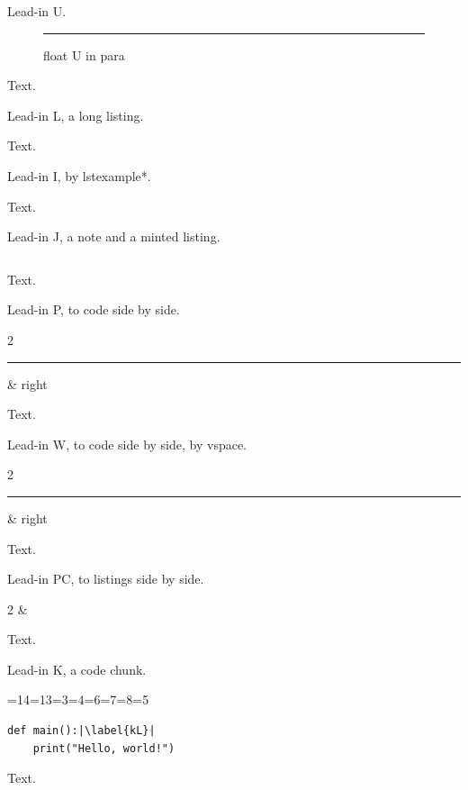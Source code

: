 Lead-in U.\label{u}\begin{figure}[h]\rule{1pt}{1pt}\caption{float U in para}\end{figure}
Text.

Lead-in L, a long listing.\label{l}

Text.

Lead-in I, by lstexample*.\label{i}

%
Text.

Lead-in J, a note and a minted listing.\label{j}

%
\inputminted[escapeinside=||]{text}{\jobname-j.txt}
Text.

Lead-in P, to code side by side.\label{p}

\begin{didacticpair}{2}
  \rule{1pt}{8\baselineskip}\label{pL} & right
\end{didacticpair}
Text.

Lead-in W, to code side by side, by vspace.\label{w}
\vspace{2pt}
\begin{didacticpair}{2}
  \rule{1pt}{8\baselineskip}\label{wL} & right
\end{didacticpair}
Text.

Lead-in PC, to listings side by side.\label{pc}

%
\begin{didacticpair}{2}
   & \label{pcL}
\end{didacticpair}
Text.

\makeatletter
\ifdefined\nwbegincode
\makeatother
{}
Lead-in K, a code chunk.\label{k}

\endmoddef\nwstartdeflinemarkup\nwenddeflinemarkup
{}=14\relax{}=13\relax{}=3\relax{}=4\relax{}=6\relax{}=7\relax{}=8\relax{}=5\relax\partopsep=0pt\relax\begin{verbatim}
def main():|\label{kL}|
    print("Hello, world!")
\end{verbatim}
\nwendcode{}\nwdocspar
Text.
\nwenddocs{}
\else
\makeatother
\fi

